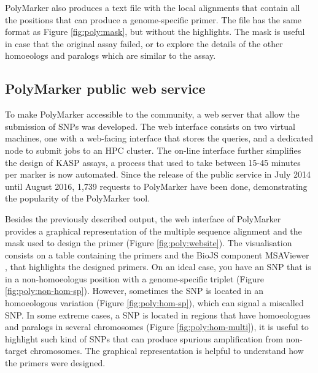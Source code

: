 PolyMarker also produces a text file with the local alignments that contain all the positions that can produce a genome-specific primer. 
The file has the same format as Figure \ref{fig:poly:mask}, but without the highlights. 
The mask is useful in case that the original assay failed, or to explore the details of the other homoeologs and paralogs which are similar to the assay. 

\subsection{PolyMarker public web service}
To make PolyMarker accessible to the community, a web server that allow the submission of SNPs was developed. 
The web interface consists on two virtual machines, one with a web-facing interface that stores the queries, and a dedicated node to submit jobs to an HPC cluster.
The on-line interface further simplifies the design of KASP assays, a process that used to take between 15-45 minutes per marker is now automated. 
Since the release of the public service in July 2014 until August 2016, 1,739 requests to PolyMarker have been done, demonstrating the popularity of the PolyMarker tool. 

Besides the previously described output, the web interface of PolyMarker provides a graphical representation of the multiple sequence alignment and the mask used to design the primer (Figure \ref{fig:poly:website}). 
The visualisation consists on a table containing the primers and the BioJS component MSAViewer \citep{Yachdav2016}, that highlights the designed primers. 
On an ideal case, you have an SNP that is in a non-homoeologus position with a genome-specific triplet (Figure \ref{fig:poly:non-hom-sp}). 
However, sometimes the SNP is located in an homoeologous variation (Figure \ref{fig:poly:hom-sp}), which can signal a miscalled SNP. 
In some extreme cases, a SNP is located in regions that have homoeologues and paralogs in several chromosomes (Figure \ref{fig:poly:hom-multi}), it is useful to highlight such kind of SNPs that can produce spurious amplification from non-target chromosomes. 
The graphical representation is helpful to understand how the primers were designed.


